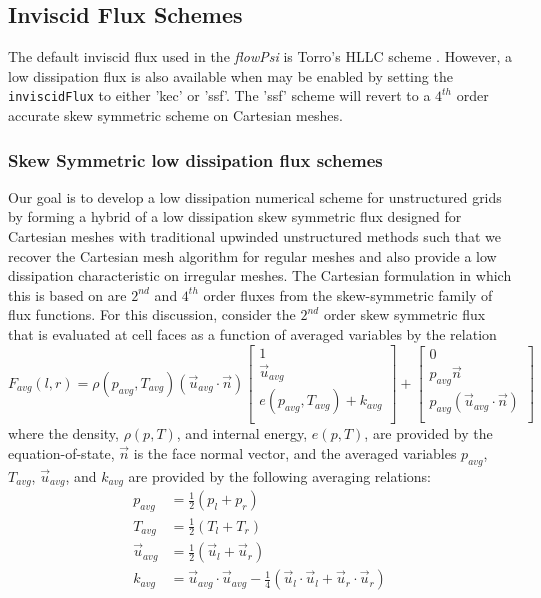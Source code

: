 \subsection{Inviscid Flux Schemes}

The default inviscid flux used in the {\it flowPsi} is Torro's HLLC
scheme \cite{Torro.1994}.  However, a low dissipation flux is also
available when may be enabled by setting the {\tt inviscidFlux} to
either 'kec' or 'ssf'.  The 'ssf' scheme will revert to a $4^{th}$
order accurate skew symmetric scheme on Cartesian meshes.

\subsubsection{Skew Symmetric low dissipation flux schemes}


Our goal is to develop a low dissipation numerical scheme for
unstructured grids by forming a hybrid of a low dissipation skew
symmetric flux designed for Cartesian meshes with traditional upwinded
unstructured methods such that we recover the Cartesian mesh algorithm
for regular meshes and also provide a low dissipation characteristic
on irregular meshes.  The Cartesian formulation in which this is based on 
are $2^{nd}$ and $4^{th}$ order fluxes from the skew-symmetric family
of flux functions.  For this discussion, consider the $2^{nd}$ order
skew symmetric flux that is evaluated at cell faces as a function of
averaged variables by the relation
\begin{equation}
F_{avg}(l,r) = \rho(p_{avg},T_{avg}) \left(\vec{u}_{avg}\cdot\vec{n}\right)
\label{eq:cflux}
\begin{bmatrix}
  1\\
\vec{u}_{avg}\\
e(p_{avg},T_{avg}) + k_{avg}\\
\end{bmatrix} +
\begin{bmatrix}
0\\
p_{avg} \vec{n} \\
p_{avg} \left(\vec{u}_{avg}\cdot \vec{n}\right)\\
\end{bmatrix}
\end{equation}
where the density, $\rho(p,T)$, and internal energy, $e(p,T)$, are
provided by the equation-of-state, $\vec{n}$ is the face normal
vector, and the averaged variables $p_{avg}$, $T_{avg}$,
$\vec{u}_{avg}$, and $k_{avg}$ are provided by the following averaging
relations:
\begin{equation}
\begin{aligned}
p_{avg} &= \frac{1}{2}\left(p_l + p_r\right)\\
T_{avg} &= \frac{1}{2}\left(T_l + T_r\right)\\
\vec{u}_{avg} & = \frac{1}{2}\left(\vec{u}_l + \vec{u}_r\right)\\
k_{avg} &= \vec{u}_{avg}\cdot\vec{u}_{avg}-\frac{1}{4} \left( \vec{u}_l\cdot\vec{u}_l + \vec{u}_r\cdot\vec{u}_r\right)\\
\label{eq:averaging}
\end{aligned}
\end{equation}

